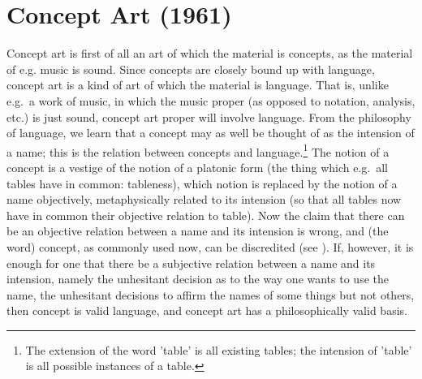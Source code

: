 \chapter{Concept Art (1961)}

Concept art is first of all an art of which the material is concepts, as the 
material of e.g. music is sound. Since concepts are closely bound up with 
language, concept art is a kind of art of which the material is language. That 
is, unlike e.g.\ a work of music, in which the music proper (as opposed to 
notation, analysis, etc.) is just sound, concept art proper will involve 
language. From the philosophy of language, we learn that a concept may as 
well be thought of as the intension of a name; this is the relation between 
concepts and language.\footnote{The extension of the word 'table' is all 
existing tables; the intension of 'table' is all possible instances of a table.}
The notion of a concept is a vestige of the notion of 
a platonic form (the thing which e.g.\ all tables have in common: tableness), 
which notion is replaced by the notion of a name objectively, metaphysically 
related to its intension (so that all tables now have in common their 
objective relation to table). Now the claim that there can be an objective 
relation between a name and its intension is wrong, and (the word) concept, 
as commonly used now, can be discredited (see ). If, however, it is enough for one that there be a subjective relation 
between a name and its intension, namely the unhesitant decision as to the 
way one wants to use the name, the unhesitant decisions to affirm the names 
of some things but not others, then concept is valid language, and concept 
art has a philosophically valid basis. 

